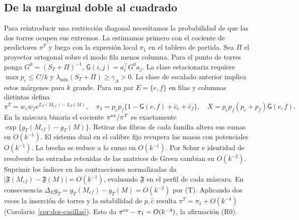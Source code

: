 \subsection{De la marginal doble al cuadrado}
\label{app:pair}
Para reintroducir una restricción diagonal necesitamos la probabilidad de que las dos torres
ocupen sus extremos. La estimamos primero con el cociente de predictores $\pi^T$ y luego con
la expresión local $\pi_1$ en el tablero de partida. Sea $\Pi$ el proyector ortogonal sobre el
modo fila menos columna. Para el punto de torres ponga
$G^0=(S_T+\Pi)^{-1}$, $\mathsf G(i,j)=a_i^\top G^0a_j$. La clase estacionaria requiere
$\max p_e\le C/k$ y $\lambda_{\min}(S_T+\Pi)\ge\gamma_A>0$. La clase de escalado anterior
implica estos márgenes para $k$ grande. Para un par $E=\{e,f\}$ en filas y columnas distintas
defina
\[
 \pi^T=w_ew_f e^{L_T(M_{ef})-L_T(M)},\quad
 \pi_1=p_ep_f\{1-\mathsf G(e,f)+\hat c_e+\hat c_f\},\quad
 X=p_ep_f(p_e+p_f)\mathsf G(e,f).
\]
En la máscara binaria el cociente $\pi^{\rm ex}/\pi^T$ es exactamente
$\exp\{g_T(M_{ef})-g_T(M)\}$. Retirar dos fibras de cada familia altera sus sumas en
$O(k^{-1})$. El sistema dual en el calibre fijo recupera las masas con potenciales $O(k^{-1})$.
La brecha se reduce a lo sumo en $O(k^{-1})$. Por Schur e identidad de resolvente las entradas
retenidas de las matrices de Green cambian en $O(k^{-2})$. Suprimir los índices en las
contracciones normalizadas da $|\mathfrak F(M_{ef})-\mathfrak F(M)|=O(k^{-1})$, evaluando
$\mathfrak F$ en el perfil de cada máscara. En consecuencia
$\Delta_E g_T=g_T(M_{ef})-g_T(M)=O(k^{-2})$ por (T). Aplicando dos veces la inserción de
torres y la estabilidad de $p,\hat c$ resulta $\pi^T=\pi_1+O(k^{-4})$ (Corolario~\ref{cor:dos-casillas}).
Esto da $\pi^{\rm ex}-\pi_1=O(k^{-4})$, la afirmación (R0).

